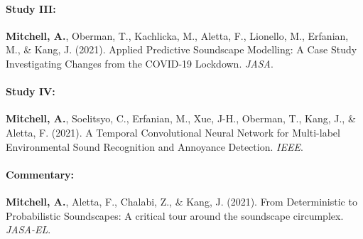 \documentclass[twoside,fontsize=12pt,titlepage]{scrbook}
\begin{document}
 \paragraph*{Study III:  }
 \textbf{Mitchell, A.}, Oberman, T., Kachlicka, M., Aletta, F., Lionello, M., Erfanian, M., \& Kang, J. (2021). Applied Predictive Soundscape Modelling: A Case Study Investigating Changes from the COVID-19 Lockdown. \emph{JASA}.
 
 \paragraph*{Study IV:   }
 \textbf{Mitchell, A.}, Soelitsyo, C., Erfanian, M., Xue, J-H., Oberman, T., Kang, J., \& Aletta, F. (2021). A Temporal Convolutional Neural Network for Multi-label Environmental Sound Recognition and Annoyance Detection. \emph{IEEE}.
 
 \paragraph*{Commentary: }
 \textbf{Mitchell, A.}, Aletta, F., Chalabi, Z., \& Kang, J. (2021). From Deterministic to Probabilistic Soundscapes: A critical tour around the soundscape circumplex. \emph{JASA-EL}.
 
 
 
 
 
 
\end{document}

